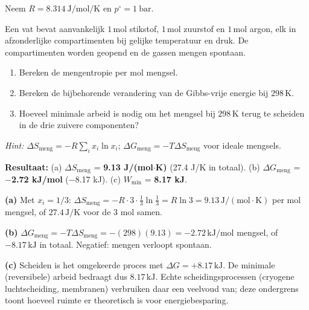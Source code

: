 
Neem $R = \SI{8.314}{\joule\per\mole\per\kelvin}$ en $p^\circ = \SI{1}{\bar}$.

\begin{oefening}\label{oef:meng-scheiden}
Een vat bevat aanvankelijk \(1\,\mathrm{mol}\) stikstof, \(1\,\mathrm{mol}\) zuurstof en \(1\,\mathrm{mol}\) argon, elk in afzonderlijke compartimenten bij gelijke temperatuur en druk. De compartimenten worden geopend en de gassen mengen spontaan.

\begin{enumerate}
\item[(a)]
  Bereken de mengentropie per mol mengsel.
\item[(b)]
  Bereken de bijbehorende verandering van de Gibbs-vrije energie bij \(298\,\mathrm{K}\).
\item[(c)]
  Hoeveel minimale arbeid is nodig om het mengsel bij \(298\,\mathrm{K}\) terug te scheiden in de drie zuivere componenten?
\end{enumerate}

\emph{Hint:} \(\Delta S_{\text{meng}} = -R\sum_i x_i \ln x_i\); \(\Delta G_{\text{meng}} = -T \Delta S_{\text{meng}}\) voor ideale mengsels.
\end{oefening}
\begin{oplossing}
\textbf{Resultaat:} (a) \(\Delta S_{\text{meng}}\) = \textbf{9.13 J/(mol\ensuremath{\cdot{}}K)} (27.4 J/K in totaal). (b) \(\Delta G_{\text{meng}}\) = \textbf{\ensuremath{-}2.72 kJ/mol} (\ensuremath{-}8.17 kJ). (c) \(W_{\min}\) = \textbf{8.17 kJ}.

\textbf{(a)} Met \(x_i = 1/3\): \(\Delta S_{\text{meng}} = -R \cdot 3 \cdot \frac{1}{3}\ln\frac{1}{3} = R\ln 3 = 9.13\,\mathrm{J/(mol\cdot K)}\) per mol mengsel, of \(27.4\,\mathrm{J/K}\) voor de 3 mol samen.

\textbf{(b)} \(\Delta G_{\text{meng}} = -T\Delta S_{\text{meng}} = -(298)(9.13) = -2.72\,\mathrm{kJ/mol}\) mengsel, of \(-8.17\,\mathrm{kJ}\) in totaal. Negatief: mengen verloopt spontaan.

\textbf{(c)} Scheiden is het omgekeerde proces met \(\Delta G = +8.17\,\mathrm{kJ}\). De minimale (reversibele) arbeid bedraagt dus \(8.17\,\mathrm{kJ}\). Echte scheidingsprocessen (cryogene luchtscheiding, membranen) verbruiken daar een veelvoud van; deze ondergrens toont hoeveel ruimte er theoretisch is voor energiebesparing.
\end{oplossing}


